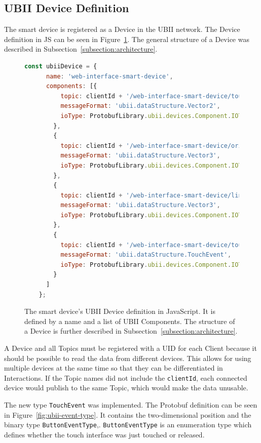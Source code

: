 \subsection{UBII Device Definition}\label{subsection:ubii-device-definition}

The smart device is registered as a Device in the \gls{UBII} network. The Device definition in \gls{JS} can be seen in Figure~\ref{fig:ubii-device-registration}. The general structure of a Device was described in Subsection~\ref{subsection:architecture}.

\begin{figure}[H]
	\begin{lstlisting}[language=JavaScript]
    const ubiiDevice = {
      name: 'web-interface-smart-device',
      components: [{
          topic: clientId + '/web-interface-smart-device/touch_position',
          messageFormat: 'ubii.dataStructure.Vector2',
          ioType: ProtobufLibrary.ubii.devices.Component.IOType.INPUT
        },
        {
          topic: clientId + '/web-interface-smart-device/orientation',
          messageFormat: 'ubii.dataStructure.Vector3',
          ioType: ProtobufLibrary.ubii.devices.Component.IOType.INPUT
        },
        {
          topic: clientId + '/web-interface-smart-device/linear_acceleration',
          messageFormat: 'ubii.dataStructure.Vector3',
          ioType: ProtobufLibrary.ubii.devices.Component.IOType.INPUT
        },
        {
          topic: clientId + '/web-interface-smart-device/touch_events',
          messageFormat: 'ubii.dataStructure.TouchEvent',
          ioType: ProtobufLibrary.ubii.devices.Component.IOType.INPUT
        }
      ]
    };
  \end{lstlisting}
	\caption[Protobuf definition of the smart device]{The smart device's \gls{UBII} Device definition in JavaScript. It is defined by a name and a list of \gls{UBII} Components. The structure of a Device is further described in Subsection~\ref{subsection:architecture}.}\label{fig:ubii-device-registration}
\end{figure}

A Device and all Topics must be registered with a \gls{UID} for each Client because it should be possible to read the data from different devices. This allows for using multiple devices at the same time so that they can be differentiated in Interactions. If the Topic names did not include the \lstinline{clientId}, each connected device would publish to the same Topic, which would make the data unusable.

The new type \lstinline{TouchEvent} was implemented. The \gls{Protobuf} definition can be seen in Figure~\ref{fig:ubii-event-type}. It contains the two-dimensional position and the binary type \mbox{\lstinline{ButtonEventType},}. \lstinline{ButtonEventType} is an enumeration type which defines whether the touch interface was just touched or released.

